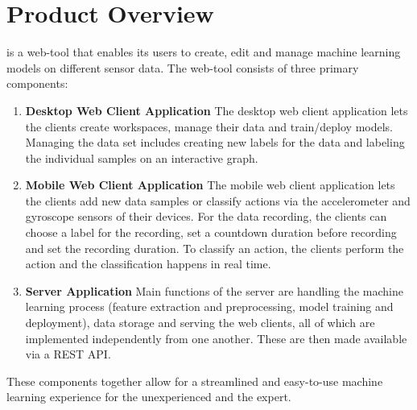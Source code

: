 \section{Product Overview}

 {\pseProjectName} is a web-tool that enables its users to create, edit and manage machine learning models on different sensor data. The web-tool consists of three primary components:

\begin{enumerate}
    \item \textbf{Desktop Web Client Application}
    The desktop web client application lets the clients create workspaces, manage their data and train/deploy models. Managing the data set includes creating new labels for the data and labeling the individual samples on an interactive graph.

    \item \textbf{Mobile Web Client Application}
    The mobile web client application lets the clients add new data samples or classify actions via the accelerometer and gyroscope sensors of their devices. For the data recording, the clients can choose a label for the recording, set a countdown duration before recording and set the recording duration. To \gls{classify} an action, the clients perform the action and the classification happens in real time.

    \item \textbf{Server Application}
     Main functions of the server are handling the machine learning process (feature extraction and preprocessing, model training and deployment), data storage and serving the web clients, all of which are implemented independently from one another. These are then made available via a REST API. 
     
\end{enumerate}

These components together allow for a streamlined and easy-to-use machine learning experience for the unexperienced and the expert.